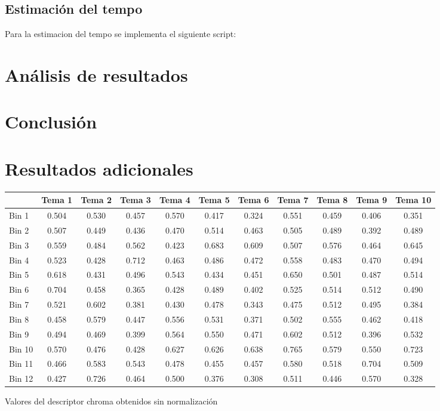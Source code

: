 \documentclass[]{article}
\makeatletter
\newcommand{\tabla}[4]{
\begin{tablehere}
\begin{center}
\begin{tabular}{#1}
#2
\end{tabular}
\caption{#3}
\label{#4}
\end{center}
\end{tablehere}
}
\newenvironment{tablehere}    %
  {\def\@captype{table}}    %

  {}              %
\makeatother
\begin{document}
\begin{multicols}{2}
\subsection{Estimación del tempo}
\label{sec: tempo}
Para la estimacion del tempo se implementa el siguiente script:


\section{Análisis de resultados}


\section{Conclusión}
\printbibliography
\end{multicols}

\newpage

\appendix
\section{Resultados adicionales}

\tabla
{|l|c|c|c|c|c|c|c|c|c|c|}
{
\hline
 &Tema 1 & Tema 2 & Tema 3 & Tema 4 & Tema 5 & Tema 6 & Tema 7 & Tema 8 & Tema 9 & Tema 10 \\
\hline
Bin 1 & 0.504 & 0.530 & 0.457 & 0.570 & 0.417 & 0.324 & 0.551 & 0.459 & 0.406 & 0.351 \\
\hline
Bin 2 & 0.507 & 0.449 & 0.436 & 0.470 & 0.514 & 0.463 & 0.505 & 0.489 & 0.392 & 0.489 \\
\hline
Bin 3 & 0.559 & 0.484 & 0.562 & 0.423 & 0.683 & 0.609 & 0.507 & 0.576 & 0.464 & 0.645 \\
\hline
Bin 4 & 0.523 & 0.428 & 0.712 & 0.463 & 0.486 & 0.472 & 0.558 & 0.483 & 0.470 & 0.494 \\
\hline
Bin 5 & 0.618 & 0.431 & 0.496 & 0.543 & 0.434 & 0.451 & 0.650 & 0.501 & 0.487 & 0.514 \\
\hline
Bin 6 & 0.704 & 0.458 & 0.365 & 0.428 & 0.489 & 0.402 & 0.525 & 0.514 & 0.512 & 0.490 \\
\hline
Bin 7 & 0.521 & 0.602 & 0.381 & 0.430 & 0.478 & 0.343 & 0.475 & 0.512 & 0.495 & 0.384 \\
\hline
Bin 8 & 0.458 & 0.579 & 0.447 & 0.556 & 0.531 & 0.371 & 0.502 & 0.555 & 0.462 & 0.418 \\
\hline
Bin 9 & 0.494 & 0.469 & 0.399 & 0.564 & 0.550 & 0.471 & 0.602 & 0.512 & 0.396 & 0.532 \\
\hline
Bin 10 & 0.570 & 0.476 & 0.428 & 0.627 & 0.626 & 0.638 & 0.765 & 0.579 & 0.550 & 0.723 \\
\hline
Bin 11 & 0.466 & 0.583 & 0.543 & 0.478 & 0.455 & 0.457 & 0.580 & 0.518 & 0.704 & 0.509 \\
\hline
Bin 12 & 0.427 & 0.726 & 0.464 & 0.500 & 0.376 & 0.308 & 0.511 & 0.446 & 0.570 & 0.328 \\
\hline
}
{Valores del descriptor chroma obtenidos sin normalización}
{tab: chroma}
\end{document}

